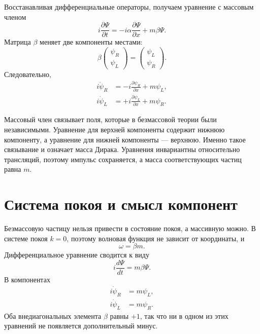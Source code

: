 Восстанавливая дифференциальные операторы, получаем уравнение с массовым членом
\begin{equation}
i\frac{\partial\Psi}{\partial t}
=
-i\alpha\frac{\partial\Psi}{\partial x}
+m\beta\Psi.
\end{equation}
Матрица \(\beta\) меняет две компоненты местами:
\begin{equation}
\beta
\begin{pmatrix}
\psi_R\\
\psi_L
\end{pmatrix}
=
\begin{pmatrix}
\psi_L\\
\psi_R
\end{pmatrix}.
\end{equation}
Следовательно,
\begin{align}
i\dot{\psi}_R
&=-i\frac{\partial\psi_R}{\partial x}+m\psi_L,\\
i\dot{\psi}_L
&=+i\frac{\partial\psi_L}{\partial x}+m\psi_R.
\end{align}

Массовый член связывает поля, которые в безмассовой теории были независимыми. Уравнение для верхней компоненты содержит нижнюю компоненту, а уравнение для нижней компоненты — верхнюю. Именно такое связывание и означает масса Дирака. Уравнения инвариантны относительно трансляций, поэтому импульс сохраняется, а масса соответствующих частиц равна \(m\).

\begin{classroomqa}
\end{classroomqa}

\section{Система покоя и смысл компонент}

Безмассовую частицу нельзя привести в состояние покоя, а массивную можно. В системе покоя \(k=0\), поэтому волновая функция не зависит от координаты, и
\begin{equation}
\omega=\beta m.
\end{equation}
Дифференциальное уравнение сводится к виду
\begin{equation}
i\frac{d\Psi}{dt}=m\beta\Psi.
\end{equation}
В компонентах
\begin{align}
i\dot{\psi}_R&=m\psi_L,\\
i\dot{\psi}_L&=m\psi_R.
\end{align}
Оба внедиагональных элемента \(\beta\) равны \(+1\), так что ни в одном из этих уравнений не появляется дополнительный минус.

